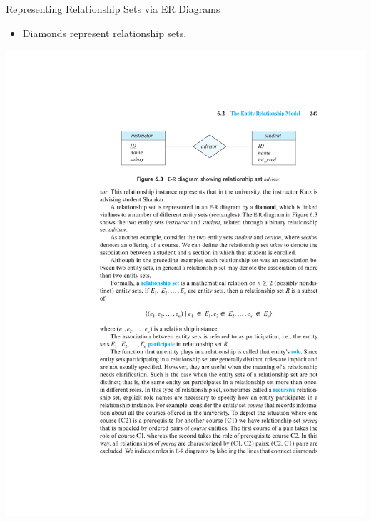 \documentclass{beamer}
\begin{document}
\begin{frame}{Representing Relationship Sets via ER Diagrams}
    \begin{itemize}
        \item Diamonds represent relationship sets.
    \end{itemize}
    \centering
    \includegraphics[trim={6.90cm 21cm 4.15cm 4cm}, clip, width=\textwidth]{figures/p247}
\end{frame}
\end{document}

